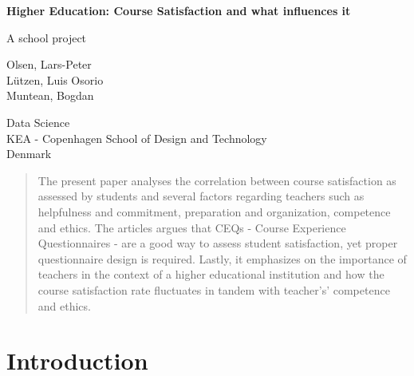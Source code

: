 \documentclass[twocolumn]{article}
\begin{document}
    \begin{titlepage}
       \begin{center}
            \vspace*{1cm}
            \huge
            \textbf{Higher Education: Course Satisfaction and what influences it}
            
            \large
            \vspace{2cm}
            A school project
     
            \vspace{1.5cm}
            
                Olsen, Lars-Peter \\
                Lützen, Luis Osorio \\ 
                Muntean, Bogdan \\
        
           \vfill
           \vspace{0.8cm}
     
           Data Science\\
           KEA - Copenhagen School of Design and Technology\\
           Denmark\\
           \date{October 2019}
       \end{center}
    \end{titlepage}

\begin{titlepage}
    \vspace*{10cm}
    \tableofcontents{}
\end{titlepage}


\begin{abstract}
The present paper analyses the correlation between course satisfaction as assessed by students and several factors regarding teachers such as helpfulness and commitment, preparation and organization, competence and ethics. The articles argues that CEQs - Course Experience Questionnaires -  are a good way to assess student satisfaction, yet proper questionnaire design is required. Lastly, it emphasizes on the importance of teachers in the context of a higher educational institution and how the course satisfaction rate fluctuates in tandem with teacher’s’ competence and ethics.
\end{abstract}

\section{Introduction} \label{introduction}
\end{document}
